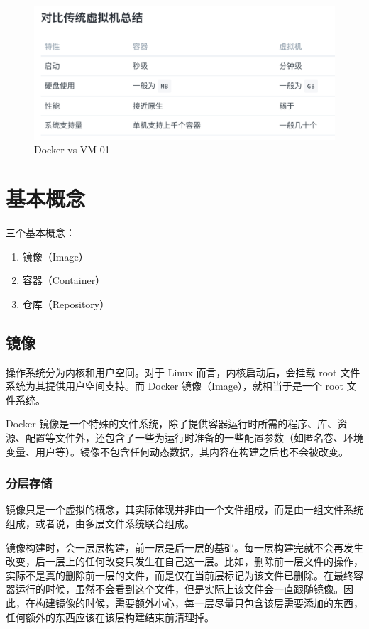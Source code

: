 \documentclass[UTF8]{ctexart}
\begin{document}
\begin{figure}[htpb]
    \centering
    \includegraphics[scale=0.3]{docker_vs_vm_02.pdf}
    \caption{Docker vs VM 01}
    \label{fig:docker_vs_vm_01}
\end{figure}

\section{基本概念}
三个基本概念：
\begin{enumerate}
    \item 镜像（Image）
    \item 容器（Container）
    \item 仓库（Repository）
\end{enumerate}

\subsection{镜像}
操作系统分为内核和用户空间。对于 Linux 而言，内核启动后，会挂载 root 文件系统为其提供用户空间支持。而 Docker 镜像（Image），就相当于是一个 root 文件系统。

Docker 镜像是一个特殊的文件系统，除了提供容器运行时所需的程序、库、资源、配置等文件外，还包含了一些为运行时准备的一些配置参数（如匿名卷、环境变量、用户等）。镜像不包含任何动态数据，其内容在构建之后也不会被改变。
\subsubsection*{分层存储}
镜像只是一个虚拟的概念，其实际体现并非由一个文件组成，而是由一组文件系统组成，或者说，由多层文件系统联合组成。 

镜像构建时，会一层层构建，前一层是后一层的基础。每一层构建完就不会再发生改变，后一层上的任何改变只发生在自己这一层。比如，删除前一层文件的操作，实际不是真的删除前一层的文件，而是仅在当前层标记为该文件已删除。在最终容器运行的时候，虽然不会看到这个文件，但是实际上该文件会一直跟随镜像。因此，在构建镜像的时候，需要额外小心，每一层尽量只包含该层需要添加的东西，任何额外的东西应该在该层构建结束前清理掉。
\end{document}
